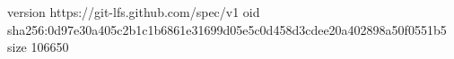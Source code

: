 version https://git-lfs.github.com/spec/v1
oid sha256:0d97e30a405c2b1c1b6861e31699d05e5c0d458d3cdee20a402898a50f0551b5
size 106650
